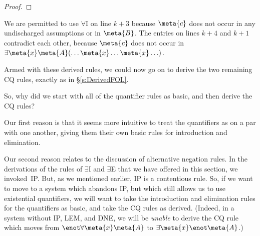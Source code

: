 \begin{proof}
	\open
	\close
	\open
	\close
\end{proof}\noindent
We are permitted to use $\forall$I on line $k+3$ because $\meta{c}$ does not occur in any  undischarged assumptions or in $\meta{B}$. The entries on lines $k+4$ and $k+1$ contradict each other, because $\meta{c}$ does not occur in $\exists \meta{x} \meta{A}(\ldots \meta{x} \ldots \meta{x} \ldots)$.

Armed with these derived rules, we could now go on to derive the two remaining CQ rules, exactly as in \S\ref{s:DerivedFOL}.

So, why did we start with all of the quantifier rules as basic, and then derive the CQ rules? 

Our first reason is that it seems more intuitive to treat the quantifiers as on a par with one another, giving them their own basic rules for introduction and elimination. 

Our second reason relates to the discussion of alternative negation rules. In the derivations of the rules of $\exists$I and $\exists$E that we have offered in this section, we invoked~IP.  But, as we mentioned earlier, IP is a contentious rule. So, if we want to move to a system which abandons IP, but which still allows us to use existential quantifiers, we will want to take the introduction and elimination rules for the quantifiers as basic, and take the CQ rules as derived. (Indeed, in a system without IP, LEM, and DNE, we will be \emph{unable} to derive the CQ rule which moves from $\enot \forall \meta{x} \meta{A}$ to $\exists \meta{x} \enot \meta{A}$.)
